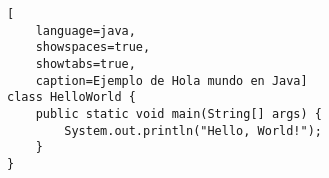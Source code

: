 \begin{lstlisting}[
    language=java,
    showspaces=true,
    showtabs=true,
    caption=Ejemplo de Hola mundo en Java]
class HelloWorld {
    public static void main(String[] args) {
        System.out.println("Hello, World!"); 
    }
}
\end{lstlisting}